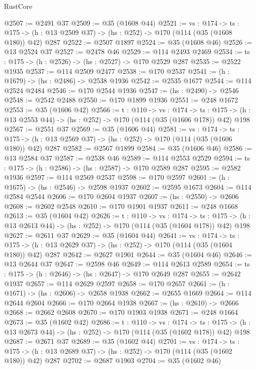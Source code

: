 \begin{lexlean}{RustCore}
\begin{coremodule}
@2507 := @2491 @37
@2509 := @35 (@1608 @44)
@2521 := {vs : @174} ->
  {ts : @175} -> (h : @13 @2509 @37) -> (hs : @252) -> @170 (@114 (@35 (@1608 @180)) @42) @287
@2522 := @2507 @1897
@2524 := @35 (@1608 @46)
@2526 := @13 @2524 @37
@2527 := @2478 @46
@2529 := @114 @2493 @2469
@2534 := {ts : @175} -> (h : @2526) -> (hs : @2527) -> @170 @2529 @287
@2535 := @2522 @1935
@2537 := @114 @2509 @2477
@2538 := @170 @2537
@2541 := (h : @1679) -> (hs : @2486) -> @2538 @1936
@2542 := @2535 @1677
@2544 := @114 @2524 @2484
@2546 := @170 @2544 @1936
@2547 := (hs : @2490) -> @2546
@2548 := @2542 @2488
@2550 := @170 @1899 @1936
@2551 := @248 @1672
@2553 := @35 (@1606 @42)
@2566 := {t : @110} ->
  {vs : @174} ->
  {ts : @175} -> (h : @13 @2553 @44) -> (hs : @252) -> @170 (@114 (@35 (@1606 @178)) @42) @198
@2567 := @2551 @37
@2569 := @35 (@1606 @44)
@2581 := {vs : @174} ->
  {ts : @175} -> (h : @13 @2569 @37) -> (hs : @252) -> @170 (@114 (@35 (@1606 @180)) @42) @287
@2582 := @2567 @1899
@2584 := @35 (@1606 @46)
@2586 := @13 @2584 @37
@2587 := @2538 @46
@2589 := @114 @2553 @2529
@2594 := {ts : @175} -> (h : @2586) -> (hs : @2587) -> @170 @2589 @287
@2595 := @2582 @1936
@2597 := @114 @2569 @2537
@2598 := @170 @2597
@2601 := (h : @1675) -> (hs : @2546) -> @2598 @1937
@2602 := @2595 @1673
@2604 := @114 @2584 @2544
@2606 := @170 @2604 @1937
@2607 := (hs : @2550) -> @2606
@2608 := @2602 @2548
@2610 := @170 @1901 @1937
@2611 := @248 @1668
@2613 := @35 (@1604 @42)
@2626 := {t : @110} ->
  {vs : @174} ->
  {ts : @175} -> (h : @13 @2613 @44) -> (hs : @252) -> @170 (@114 (@35 (@1604 @178)) @42) @198
@2627 := @2611 @37
@2629 := @35 (@1604 @44)
@2641 := {vs : @174} ->
  {ts : @175} -> (h : @13 @2629 @37) -> (hs : @252) -> @170 (@114 (@35 (@1604 @180)) @42) @287
@2642 := @2627 @1901
@2644 := @35 (@1604 @46)
@2646 := @13 @2644 @37
@2647 := @2598 @46
@2649 := @114 @2613 @2589
@2654 := {ts : @175} -> (h : @2646) -> (hs : @2647) -> @170 @2649 @287
@2655 := @2642 @1937
@2657 := @114 @2629 @2597
@2658 := @170 @2657
@2661 := (h : @1671) -> (hs : @2606) -> @2658 @1938
@2662 := @2655 @1669
@2664 := @114 @2644 @2604
@2666 := @170 @2664 @1938
@2667 := (hs : @2610) -> @2666
@2668 := @2662 @2608
@2670 := @170 @1903 @1938
@2671 := @248 @1664
@2673 := @35 (@1602 @42)
@2686 := {t : @110} ->
  {vs : @174} ->
  {ts : @175} -> (h : @13 @2673 @44) -> (hs : @252) -> @170 (@114 (@35 (@1602 @178)) @42) @198
@2687 := @2671 @37
@2689 := @35 (@1602 @44)
@2701 := {vs : @174} ->
  {ts : @175} -> (h : @13 @2689 @37) -> (hs : @252) -> @170 (@114 (@35 (@1602 @180)) @42) @287
@2702 := @2687 @1903
@2704 := @35 (@1602 @46)

\end{coremodule}
\end{lexlean}
